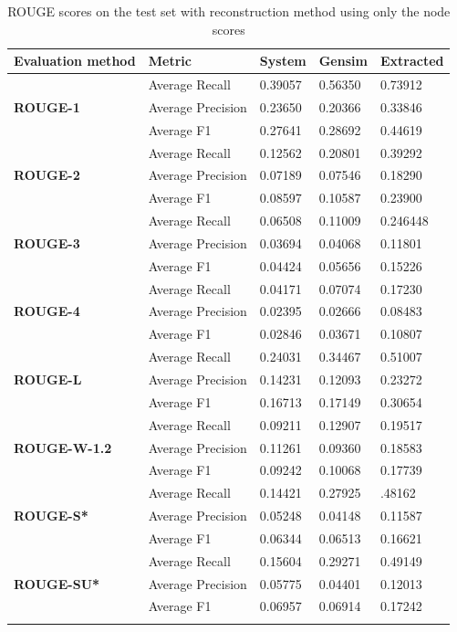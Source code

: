 \begin{longtable}{| l | l | l | l | l |}
	\hline
	\textbf{Evaluation method}&\textbf{Metric}&\textbf{System}&\textbf{Gensim}&\textbf{Extracted}\\ \hline \hline		
	\multirow{3}{*}{\textbf{ROUGE-1}}
		&Average Recall&0.39057&0.56350&0.73912 \\
		&Average Precision&0.23650&0.20366&0.33846 \\ 
		&Average F1&0.27641&0.28692&0.44619 \\ \hline \hline
	\multirow{3}{*}{\textbf{ROUGE-2}}
		&Average Recall&0.12562&0.20801&0.39292 \\
		&Average Precision&0.07189&0.07546&0.18290 \\
		&Average F1&0.08597&0.10587&0.23900 \\ \hline \hline
	\multirow{3}{*}{\textbf{ROUGE-3}}
		&Average Recall&0.06508&0.11009&0.246448 \\
		&Average Precision&0.03694&0.04068&0.11801 \\
		&Average F1&0.04424&0.05656&0.15226 \\ \hline \hline
	\multirow{3}{*}{\textbf{ROUGE-4}}
		&Average Recall&0.04171&0.07074&0.17230 \\
		&Average Precision&0.02395&0.02666&0.08483 \\
		&Average F1&0.02846&0.03671&0.10807 \\ \hline \hline
	\multirow{3}{*}{\textbf{ROUGE-L}}
		&Average Recall&0.24031&0.34467&0.51007 \\
		&Average Precision&0.14231&0.12093&0.23272 \\
		&Average F1&0.16713&0.17149&0.30654 \\ \hline \hline
	\multirow{3}{*}{\textbf{ROUGE-W-1.2}}
		&Average Recall&0.09211&0.12907&0.19517 \\
		&Average Precision&0.11261&0.09360&0.18583 \\
		&Average F1&0.09242&0.10068&0.17739 \\ \hline \hline
	\multirow{3}{*}{\textbf{ROUGE-S*}}
		&Average Recall&0.14421&0.27925&.48162 \\
		&Average Precision&0.05248&0.04148&0.11587 \\
		&Average F1&0.06344&0.06513&0.16621 \\ \hline \hline
	\multirow{3}{*}{\textbf{ROUGE-SU*}}
		&Average Recall&0.15604&0.29271&0.49149 \\
		&Average Precision&0.05775&0.04401&0.12013 \\
		&Average F1&0.06957&0.06914&0.17242 \\ \hline
	\caption{ROUGE scores on the test set with reconstruction method using only the node scores}
\end{longtable}

